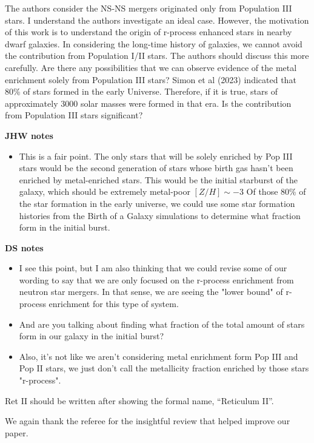 \documentclass[11pt]{article}
\begin{document}
\begin{tcolorbox}[colback={lightgray}]   
    The authors consider the NS-NS mergers originated only from Population III stars. I understand the authors investigate an ideal case. However, the motivation of this work is to understand the origin of r-process enhanced stars in nearby dwarf galaxies. In considering the long-time history of galaxies, we cannot avoid the contribution from Population I/II stars. The authors should discuss this more carefully. Are there any possibilities that we can observe evidence of the metal enrichment solely from Population III stars? Simon et al (2023) indicated that 80\% of stars formed in the early Universe. Therefore, if it is true, stars of approximately 3000 solar masses were formed in that era. Is the contribution from Population III stars significant?
\end{tcolorbox}

\noindent\textbf{JHW notes}
\begin{itemize}
  \item This is a fair point.  The only stars that will be solely enriched by Pop III stars would be the second generation of stars whose birth gas hasn't been enriched by metal-enriched stars.  This would be the initial starburst of the galaxy, which should be extremely metal-poor $[Z/H] \sim -3$  Of those 80\% of the star formation in the early universe, we could use some star formation histories from the Birth of a Galaxy simulations to determine what fraction form in the initial burst.
\end{itemize}

\noindent\textbf{DS notes}
\begin{itemize}
  \item I see this point, but I am also thinking that we could revise some of our wording to say that we are only focused on the r-process enrichment from neutron star mergers. In that sense, we are seeing the "lower bound" of r-process enrichment for this type of system.
  \item And are you talking about finding what fraction of the total amount of stars form in our galaxy in the initial burst? 
  \item Also, it's not like we aren't considering metal enrichment form Pop III and Pop II stars, we just don't call the metallicity fraction enriched by those stars "r-process". 
\end{itemize}

\begin{tcolorbox}[colback={lightgray}] 
Ret II should be written after showing the formal name, “Reticulum II”.
\end{tcolorbox} 

We again thank the referee for the insightful review that helped improve our paper.



\end{document}
